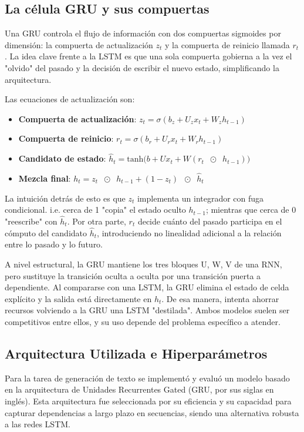 \subsection{La célula GRU y sus compuertas}

Una GRU controla el flujo de información con dos compuertas sigmoides por dimensión: la compuerta de actualización $z_t$ y  la compuerta de reinicio llamada $r_t$. La idea clave frente a la LSTM es que una sola compuerta gobierna a la vez el "olvido" del pasado y la decisión de escribir el nuevo estado, simplificando la arquitectura. 

Las ecuaciones de actualización son:

\begin{itemize}
    \item \textbf{Compuerta de actualización}: $z_t = \sigma(b_z + U_z x_t + W_z h_{t-1})$
    \item \textbf{Compuerta de reinicio}: $r_t = \sigma(b_r + U_r x_t + W_r h_{t-1})$
    \item \textbf{Candidato de estado}: $\hat{h}_t = \text{tanh}\Big(b + Ux_t + W(r_t \;\; \odot \;\; h_{t-1})\Big)$
    \item \textbf{Mezcla final}: $h_t = z_t \;\; \odot \;\; h_{t-1} + (1 - z_t) \;\; \odot \;\; \hat{h}_t$ 
\end{itemize}

La intuición detrás de esto es que $z_t$ implementa un integrador con fuga condicional. i.e. cerca de 1 "copia" el estado oculto $h_{t-1}$; mientras que cerca de 0 "reescribe" con $\hat{h}_t$. Por otra parte, $r_t$ decide cuánto del pasado participa en el cómputo del candidato $\hat{h}_t$, introduciendo no linealidad adicional a la relación entre lo pasado y lo futuro. 

A nivel estructural, la GRU mantiene los tres bloques U, W, V de una RNN, pero sustituye la transición oculta a oculta por una transición puerta a dependiente. Al compararse con una LSTM, la GRU elimina el estado de celda explícito y la salida está directamente en $h_t$. De esa manera, intenta ahorrar recursos volviendo a la GRU una LSTM "destilada". Ambos modelos suelen ser competitivos entre ellos, y su uso depende del problema específico a atender. 

\subsection{Arquitectura Utilizada e Hiperparámetros}

Para la tarea de generación de texto se implementó y evaluó un modelo basado en la arquitectura de Unidades Recurrentes Gated (GRU, por sus siglas en inglés). Esta arquitectura fue seleccionada por su eficiencia y su capacidad para capturar dependencias a largo plazo en secuencias, siendo una alternativa robusta a las redes LSTM.

